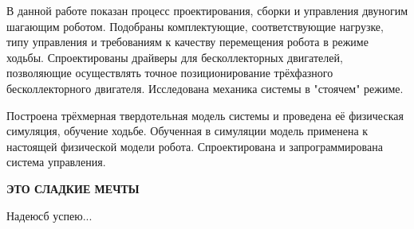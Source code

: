 
В данной работе показан процесс проектирования, сборки и управления двуногим шагающим роботом. Подобраны комплектующие, соответствующие нагрузке, типу управления и требованиям к качеству перемещения робота в режиме ходьбы. Спроектированы драйверы для бесколлекторных двигателей, позволяющие осуществлять точное позиционирование трёхфазного бесколлекторного двигателя. Исследована механика системы в "стоячем" режиме. 

Построена трёхмерная твердотельная модель системы и проведена её физическая симуляция, обучение ходьбе. Обученная в симуляции модель применена к настоящей физической модели робота. Спроектирована и запрограммирована система управления. 

\textbf{ЭТО СЛАДКИЕ МЕЧТЫ}

Надеюсб успею...